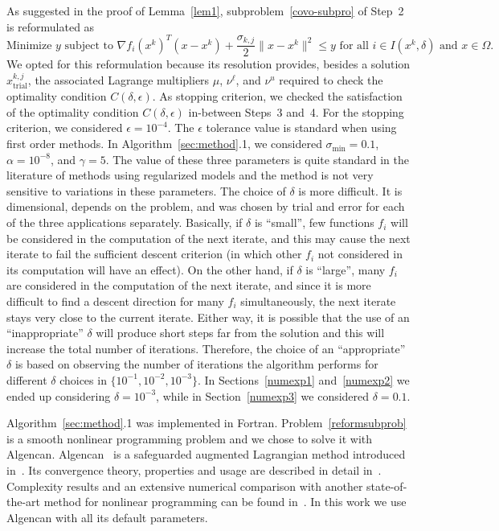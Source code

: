 \documentclass[11pt]{article}
\newcommand{\xkjtrial}{x^{k,j}_{\mathrm{trial}}}
\begin{document}
As suggested in the proof of Lemma~\ref{lem1}, subproblem~\eqref{covo-subpro} of Step~2 is reformulated as 
\begin{equation} \label{reformsubprob}
\mbox{Minimize } y \mbox{ subject to } \nabla f_i(x^k)^T (x-x^k) + \dfrac{\sigma_{k,j}}{2} \| x - x^k \|^2 \leq y \mbox{ for all } i \in I(x^k,\delta) \mbox{ and } x \in \Omega.
\end{equation}
We opted for this reformulation because its resolution provides, besides a solution $\xkjtrial$, the associated Lagrange multipliers $\mu$, $\nu^{\ell}$, and $\nu^u$ required to check the optimality condition $C(\delta,\epsilon)$. As stopping criterion, we checked the satisfaction of the optimality condition $C(\delta,\epsilon)$ in-between Steps~3 and~4. For the stopping criterion, we considered $\epsilon=10^{-4}$. The $\epsilon$ tolerance value is standard when using first order methods. In Algorithm~\ref{sec:method}.1, we considered $\sigma_{\min} = 0.1$, $\alpha = 10^{-8}$, and $\gamma = 5$. The value of these three parameters is quite standard in the literature of methods using regularized models and the method is not very sensitive to variations in these parameters. The choice of $\delta$ is more difficult. It is dimensional, depends on the problem, and was chosen by trial and error for each of the three applications separately. Basically, if $\delta$ is ``small'', few functions $f_i$ will be considered in the computation of the next iterate, and this may cause the next iterate to fail the sufficient descent criterion (in which other $f_i$ not considered in its computation will have an effect). On the other hand, if $\delta$ is ``large'', many $f_i$ are considered in the computation of the next iterate, and since it is more difficult to find a descent direction for many $f_i$ simultaneously, the next iterate stays very close to the current iterate. Either way, it is possible that the use of an ``inappropriate'' $\delta$ will produce short steps far from the solution and this will increase the total number of iterations. Therefore, the choice of an ``appropriate'' $\delta$ is based on observing the number of iterations the algorithm performs for different $\delta$ choices in $\{10^{-1}, 10^{-2}, 10^{-3}\}$. In Sections~\ref{numexp1} and~\ref{numexp2} we ended up considering $\delta=10^{-3}$, while in Section~\ref{numexp3} we considered $\delta=0.1$.

Algorithm~\ref{sec:method}.1 was implemented in Fortran. Problem~\eqref{reformsubprob} is a smooth nonlinear programming problem and we chose to solve it with Algencan. Algencan~\cite{abmstango,bmbook,bmcomper} is a safeguarded augmented Lagrangian method introduced in~\cite{abmsobso,abmstango}. Its convergence theory, properties and usage are described in detail in~\cite{bmbook}. Complexity results and an extensive numerical comparison with another state-of-the-art method for nonlinear programming can be found in~\cite{bmcomper}. In this work we use Algencan with all its default parameters.
\end{document}
